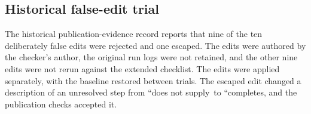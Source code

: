 \documentclass[10pt]{article}
\newcommand{\HistoricalEdits}{ten}
\newcommand{\HistoricalRejected}{nine}
\newcommand{\HistoricalEscaped}{one}
\newcommand{\HistoricalNotRerun}{nine}
\begin{document}
\subsection{Historical false-edit trial}
The historical publication-evidence record reports that \HistoricalRejected{} of the \HistoricalEdits{} deliberately false edits were rejected and \HistoricalEscaped{} escaped.
The edits were authored by the checker's author, the original run logs were not retained, and the other \HistoricalNotRerun{} edits were not rerun against the extended checklist.
The edits were applied separately, with the baseline restored between trials.
The escaped edit changed a description of an unresolved step from ``does not supply\textquotesingle\textquotesingle\ to ``completes\textquotesingle\textquotesingle, and the publication checks accepted it.
\end{document}
